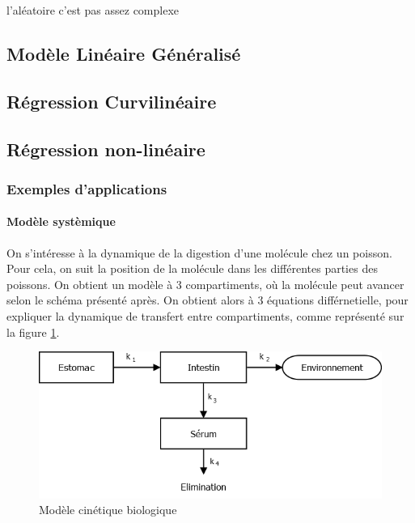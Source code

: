 \documentclass[
]{article}
\begin{document}
l'aléatoire c'est pas assez complexe

\hypertarget{moduxe8le-linuxe9aire-guxe9nuxe9ralisuxe9}{%
\subsection{Modèle Linéaire
Généralisé}\label{moduxe8le-linuxe9aire-guxe9nuxe9ralisuxe9}}

\hypertarget{ruxe9gression-curvilinuxe9aire}{%
\subsection{Régression
Curvilinéaire}\label{ruxe9gression-curvilinuxe9aire}}

\hypertarget{ruxe9gression-non-linuxe9aire}{%
\subsection{Régression
non-linéaire}\label{ruxe9gression-non-linuxe9aire}}

\hypertarget{exemples-dapplications}{%
\subsubsection{Exemples d'applications}\label{exemples-dapplications}}

\hypertarget{moduxe8le-systuxe8mique}{%
\paragraph{Modèle systèmique}\label{moduxe8le-systuxe8mique}}

On s'intéresse à la dynamique de la digestion d'une molécule chez un
poisson. Pour cela, on suit la position de la molécule dans les
différentes parties des poissons. On obtient un modèle à 3
compartiments, où la molécule peut avancer selon le schéma présenté
après. On obtient alors à 3 équations différnetielle, pour expliquer la
dynamique de transfert entre compartiments, comme représenté sur la
figure \ref{CinBio}.

\begin{figure}
  \centering
  \includegraphics{Regression/Model_Cin_Bio.png}
  \caption{Modèle cinétique biologique}
  \label{CinBio}
\end{figure}
\end{document}
